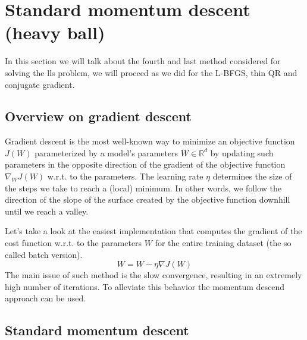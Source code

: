 \section{Standard momentum descent (heavy ball)}
In this section we will talk about the fourth and last method considered for solving the lls problem, we will proceed as we did for the L-BFGS, thin QR and conjugate gradient.

\subsection{Overview on gradient descent}
Gradient descent is the most well-known way to minimize an objective function $J(W)$ parameterized by a model's parameters $W \in \mathbb{R}^d$ by updating such parameters in the opposite direction of the gradient of the objective function $\nabla_{W}J(W)$  w.r.t. to the parameters. The learning rate $\eta$ determines the size of the steps we take to reach a (local) minimum. In other words, we follow the direction of the slope of the surface created by the objective function downhill until we reach a valley.
\vspace{3mm}

\noindent Let's take a look at the easiest implementation that computes the gradient of the cost function w.r.t. to the parameters $W$ for the entire training dataset (the so called batch version).
\begin{equation}
    W = W - \eta \nabla J(W)
    \label{eq:smd_batch_gradient_descent}
\end{equation}
The main issue of such method is the slow convergence, resulting in an extremely high number of iterations. To alleviate this behavior the momentum descend approach can be used.

\subsection{Standard momentum descent}


